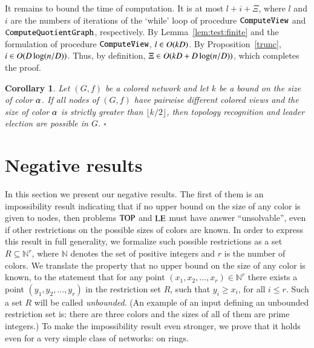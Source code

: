 \documentclass[a4paper,10pt]{article}
\newtheorem{corollary}{Corollary}[section]
\newcommand{\commonTimeMax}{\Xi}
\newcommand{\nats}{\mathbb{N}}
\newcommand{\algorithmQuotient}{\textup{\texttt{ComputeQuotientGraph}}}
\newcommand{\algorithmView}{\textup{\texttt{ComputeView}}}
\newcommand{\problemLE}{\textup{LE}}
\newcommand{\problemTOP}{\textup{TOP}}
\newcommand{\qed}{\hfill $\square$ \smallbreak}
\newenvironment{proof}[1][Proof]
{\par\noindent{\bf #1:} }{\hspace*{\fill}\nolinebreak{$\Box$}\bigskip\par}
\begin{document}
\begin{proof}
It remains to bound the time of computation.
It is at most $l+i+\commonTimeMax$, where $l$ and $i$ are the numbers of iterations of the `while' loop of procedure $\algorithmView$ and $\algorithmQuotient$, respectively.
By Lemma~\ref{lem:test:finite} and the formulation of procedure $\algorithmView$, $l\in O(kD)$.
By Proposition~\ref{trunc}, $i\in O(D\log(n/D))$.
Thus, by definition, $\commonTimeMax\in O(k\diam+\diam\log(n/\diam))$, which completes the proof.
\end{proof}


\begin{corollary} \label{cor:main}
Let $(G,f)$ be a colored network and let $k$ be a bound on the size of color $\alpha$.
If all nodes of $(G,f)$ have pairwise different colored views and the size of color $\alpha$ is strictly greater than $\lfloor k/2\rfloor$, then topology recognition and leader election are possible in $G$.
\qed
\end{corollary}


\section{Negative results}

In this section we present our negative results. The first of them {is an impossibility result indicating} that if no upper bound on the size of any color is given to nodes, then problems $\problemTOP$ and $\problemLE$ must have answer ``unsolvable'', even if other restrictions on the possible sizes of colors are known. In order to express this result in full generality, we formalize such possible restrictions as a set $R\subseteq \nats^r$, where $\nats$ denotes the set of positive integers and $r$ is the number of colors.
We translate the property that no upper bound on the size of any color is known, to the statement
that for any point $(x_1,x_2,\dots , x_r)\in \nats^r $ there exists a point $(y_1,y_2,\dots , y_r)$  in the restriction set $R$, such that $y_i \geq x_i$, for all $i \leq r$.
Such a set $R$ will be called \emph{unbounded}.
(An example of an input defining an unbounded restriction set is: there are three colors and the sizes of all of them are prime integers.)
To make the impossibility result even stronger, we prove that it holds even for a very simple class of networks: on rings. 
\end{document}
